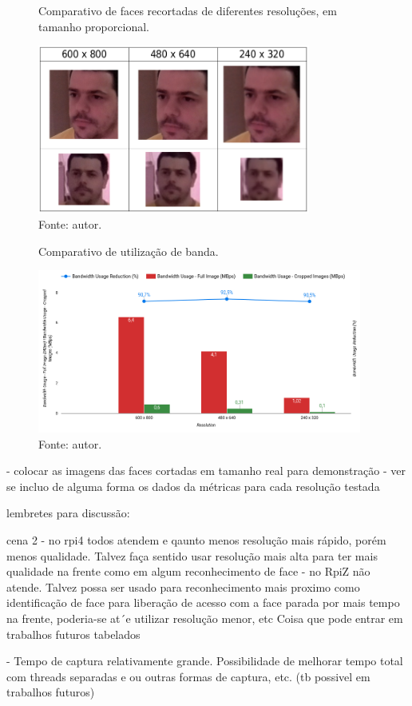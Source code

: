 \begin{figure}[h]
    \centering
    \caption[Comparativo de faces recortadas de diferentes resoluções, em tamanho proporcional.]{Comparativo de faces recortadas de diferentes resoluções, em tamanho proporcional.}
    \includegraphics[width=0.8\textwidth]{Cap4_Experimentos_Realizados/Figures/cena2_comparativo_qualidade_faces_recortadas_tamanho_proporcional.jpg}
    \caption*{Fonte: autor.}
    \label{fig:cena2_comparativo_qualidade_faces_tamanho_proporcional}
\end{figure}

\begin{figure}
    \centering
    \caption[Comparativo de utilização de banda.]{Comparativo de utilização de banda.}
    \includegraphics[width=0.95\textwidth]{Cap4_Experimentos_Realizados/Figures/cena2_comparativo_utilizacao_banda.jpg}
    \caption*{Fonte: autor.}
    \label{fig:cena2_comparativo_utilizacao_banda}
\end{figure}

- colocar as imagens das faces cortadas em tamanho real para demonstração
- ver se incluo de alguma forma os dados da métricas para cada resolução testada



lembretes para discussão:

cena 2
- no rpi4 todos atendem e qaunto menos resolução mais rápido, porém menos qualidade. Talvez faça sentido usar resolução mais alta para ter mais qualidade na frente como em algum reconhecimento de face
- no RpiZ não atende. Talvez possa ser usado para reconhecimento mais proximo como identificação de face para liberação de acesso com a face parada por mais tempo na frente, poderia-se at´e utilizar resolução menor, etc Coisa que pode entrar em trabalhos futuros tabelados

- Tempo de captura relativamente grande. Possibilidade de melhorar tempo total com threads separadas e ou outras formas de captura, etc. (tb possivel em trabalhos futuros)